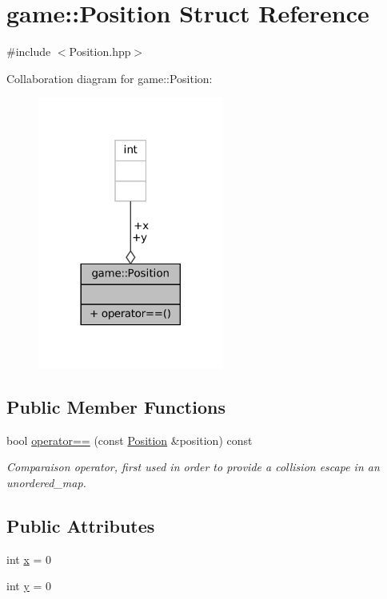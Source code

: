 \hypertarget{structgame_1_1_position}{}\section{game\+:\+:Position Struct Reference}
\label{structgame_1_1_position}


{\ttfamily \#include $<$Position.\+hpp$>$}



Collaboration diagram for game\+:\+:Position\+:
\nopagebreak
\begin{figure}[H]
\begin{center}
\leavevmode
\includegraphics[width=173pt]{structgame_1_1_position__coll__graph}
\end{center}
\end{figure}
\subsection*{Public Member Functions}
\begin{DoxyCompactItemize}
\item 
bool \hyperlink{structgame_1_1_position_a4492fdd9c13aa370f4243d69a67708b6}{operator==} (const \hyperlink{structgame_1_1_position}{Position} \&position) const
\begin{DoxyCompactList}\small\item\em Comparaison operator, first used in order to provide a collision escape in an unordered\+\_\+map. \end{DoxyCompactList}\end{DoxyCompactItemize}
\subsection*{Public Attributes}
\begin{DoxyCompactItemize}
\item 
int \hyperlink{structgame_1_1_position_ae8c20598751c6dcba6f572b6524ed100}{x} = 0
\item 
int \hyperlink{structgame_1_1_position_a0a6c4037ab49bd23ef3b3426338b39af}{y} = 0
\end{DoxyCompactItemize}


